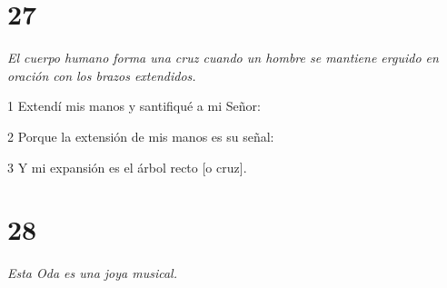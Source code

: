 \chapter{27}

\par \textit{El cuerpo humano forma una cruz cuando un hombre se mantiene erguido en oración con los brazos extendidos.}

\par 1 Extendí mis manos y santifiqué a mi Señor:
\par 2 Porque la extensión de mis manos es su señal:
\par 3 Y mi expansión es el árbol recto [o cruz].



\chapter{28}

\par \textit{Esta Oda es una joya musical.}

